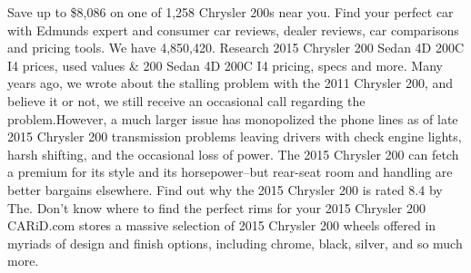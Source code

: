 \documentclass[table]{article}
\begin{document}
\begin{tcolorbox}[colback=gray!20, colframe=gray!75, rounded corners, sharp corners=northeast, sharp corners=southwest]
{Save up to \$8,086 on one of 1,258 Chrysler 200s near you. Find your perfect car with Edmunds expert and consumer car reviews, dealer reviews, car comparisons and pricing tools. We have 4,850,420. Research 2015 Chrysler 200 Sedan 4D 200C I4 prices, used values \& 200 Sedan 4D 200C I4 pricing, specs and more. Many years ago, we wrote about the stalling problem with the 2011 Chrysler 200, and believe it or not, we still receive an occasional call regarding the problem.However, a much larger issue has monopolized the phone lines as of late 2015 Chrysler 200 transmission problems leaving drivers with check engine lights, harsh shifting, and the occasional loss of power. The 2015 Chrysler 200 can fetch a premium for its style and its horsepower--but rear-seat room and handling are better bargains elsewhere. Find out why the 2015 Chrysler 200 is rated 8.4 by The. Don't know where to find the perfect rims for your 2015 Chrysler 200 CARiD.com stores a massive selection of 2015 Chrysler 200 wheels offered in myriads of design and finish options, including chrome, black, silver, and so much more.}
\end{tcolorbox}

\clearpage
\end{document}
